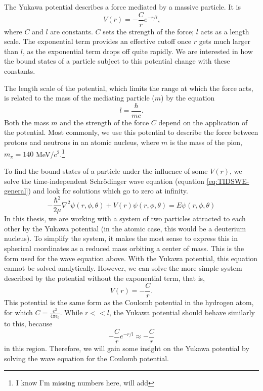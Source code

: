 \documentclass[12pt,twoside]{reedthesis}
\newcommand{\eqn}[1]{\begin{equation}#1\end{equation}}
\begin{document}
The Yukawa potential describes a force mediated by a massive particle. It is %
\eqn{
V(r) = -\frac{C}{r}e^{-r/l}\mbox{,}
}
where $C$ and $l$ are constants. $C$ sets the strength of the force; $l$ acts as a length scale. The exponential term provides an effective cutoff once $r$ gets much larger than $l$, as the exponential term drops off quite rapidly. We are interested in how the bound states of a particle subject to this potential change with these constants. 

The length scale of the potential, which limits the range at which the force acts, is related to the mass of the mediating particle ($m$) by the equation\eqn{
l = \frac{\hbar}{m c}\mbox{.}
}
Both the mass $m$ and the strength of the force $C$ depend on the application of the potential. Most commonly, we use this potential to describe the force between protons and neutrons in an atomic nucleus, where $m$ is the mass of the pion, $m_{\pi} = 140$ MeV/c$^2$.\footnote{I know I'm missing numbers here, will add}

To find the bound states of a particle under the influence of some $V(r)$, we solve the time-independent Schr\"odinger wave equation (equation \eqref{eq:TIDSWE-general}) and look for solutions which go to zero at infinity.
\eqn{
-\frac{\hbar^2}{2\mu}\nabla^2\psi(r,\phi,\theta) + V(r)\psi (r,\phi,\theta) = E \psi(r,\phi,\theta)
\label{eq:TIDSWE-general}
}
In this thesis, we are working with a system of two particles attracted to each other by the Yukawa potential (in the atomic case, this would be a deuterium nucleus). To simplify the system, it makes the most sense to express this in spherical coordinates as a reduced mass orbiting a center of mass. This is the form used for the wave equation above. With the Yukawa potential, this equation cannot be solved analytically. However, we can solve the more simple system described by the potential without the exponential term, that is,
\eqn{
 V(r) = -\frac{C}{r}\mbox{.}
 }
This potential is the same form as the Coulomb potential in the hydrogen atom, for which $C = \frac{e^2}{4\pi \epsilon_0}$. While $r << l$, the Yukawa potential should behave similarly to this, because
\begin{equation*}
-\frac{C}{r}e^{-r/l} \approx -\frac{C}{r}
\end{equation*}
in this region. Therefore, we will gain some insight on the Yukawa potential by solving the wave equation for the Coulomb potential.
\end{document}
